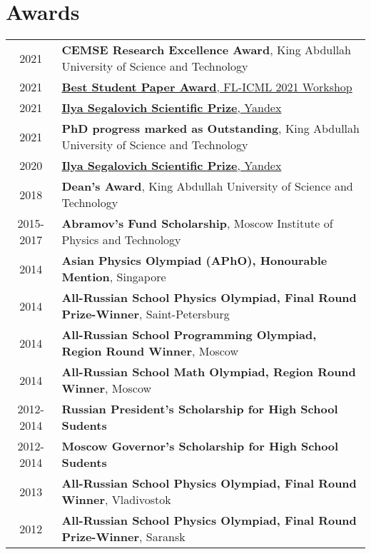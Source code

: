 \documentclass[a4paper,10pt]{article} %
\begin{document}
\section{Awards}
\hypersetup{colorlinks,breaklinks,urlcolor=black,linkcolor=black}
\begin{tabularx}{\textwidth}{cX}
	\textsc{2021} & \textbf{CEMSE Research Excellence Award}, King Abdullah University of Science and Technology\\
	\textsc{2021} & \href{http://federated-learning.org/fl-icml-2021/}{\textbf{Best Student Paper Award}, FL-ICML 2021 Workshop}\\
	\textsc{2021} & \href{https://yandex.ru/scholarships/scholars}{\textbf{Ilya Segalovich Scientific Prize}, Yandex} \\
	\textsc{2021} & {\bf PhD progress marked as Outstanding}, King Abdullah University of Science and Technology\\
	\textsc{2020} & \href{https://yandex.ru/scholarships/scholars}{\textbf{Ilya Segalovich Scientific Prize}, Yandex}\\
	\textsc{2018} & {\bf Dean's Award}, King Abdullah University of Science and Technology\\
	\textsc{2015-2017} & \textbf{Abramov’s Fund Scholarship}, Moscow Institute of Physics and Technology\\
	\textsc{2014} & \textbf{Asian Physics Olympiad (APhO), Honourable Mention}, Singapore\\
	\textsc{2014} & \textbf{All-Russian School Physics Olympiad, Final Round Prize-Winner}, Saint-Petersburg\\
	\textsc{2014} & \textbf{All-Russian School Programming Olympiad, Region Round Winner}, Moscow\\
	\textsc{2014} & \textbf{All-Russian School Math Olympiad, Region Round Winner}, Moscow\\
	\textsc{2012-2014} & \textbf{Russian President’s Scholarship for High School Sudents}\\
	\textsc{2012-2014} & \textbf{Moscow Governor’s Scholarship for High School Sudents}\\
	\textsc{2013} & \textbf{All-Russian School Physics Olympiad, Final Round Winner}, Vladivostok\\
	\textsc{2012} & \textbf{All-Russian School Physics Olympiad, Final Round Prize-Winner}, Saransk\\
\end{tabularx}
\hypersetup{colorlinks,breaklinks,urlcolor=linkcolour,linkcolor=linkcolour}
\end{document}

